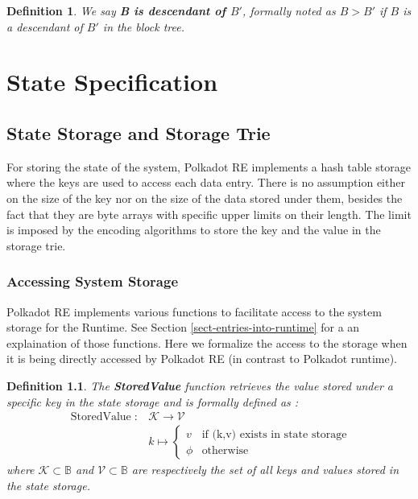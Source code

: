 \documentclass{book}
\newcommand{\tmop}[1]{\ensuremath{\operatorname{#1}}}
\newcommand{\tmstrong}[1]{\textbf{#1}}
\newcommand{\tmtextbf}[1]{{\bfseries{#1}}}
\newtheorem{definition}{Definition}
\providecommand{\tmop}[1]{\ensuremath{\mathrm{#1}}}
\providecommand{\tmstrong}[1]{\tmtextbf{#1}}
\providecommand{\tmtextbf}[1]{\tmtextbf{#1}}
\newtheorem{definition}{Definition}
\begin{document}
\begin{definition}
  We say {\tmstrong{B is descendant of $B'$}}, formally noted as {\tmstrong{$B
  > B'$}} if $B$ is a descendant of $B'$ in the block tree.
\end{definition}

\chapter{State Specification}\label{chap-state-spec}

\section{State Storage and Storage Trie}\label{sect-state-storage}

For storing the state of the system, Polkadot RE implements a hash table
storage where the keys are used to access each data entry. There is no
assumption either on the size of the key nor on the size of the data stored
under them, besides the fact that they are byte arrays with specific upper
limits on their length. The limit is imposed by the encoding algorithms to
store the key and the value in the storage trie.

\subsection{Accessing System Storage }

Polkadot RE implements various functions to facilitate access to the system
storage for the Runtime. See Section \ref{sect-entries-into-runtime} for a an
explaination of those functions. Here we formalize the access to the storage
when it is being directly accessed by Polkadot RE (in contrast to Polkadot
runtime).

\begin{definition}
  \label{defn-stored-value}The \label{autolab24}{\tmstrong{StoredValue}}
  function retrieves the value stored under a specific key in the state
  storage and is formally defined as :
  \[ \begin{array}{cc}
       \tmop{StoredValue} : & \mathcal{K} \rightarrow \mathcal{V}\\
       & k \mapsto \left\{ \begin{array}{cc}
         v & \text{if (k,v) exists in state storage}\\
         \phi & \tmop{otherwise}
       \end{array} \right.
     \end{array} \]
  where $\mathcal{K} \subset \mathbb{B}$ and $\mathcal{V} \subset \mathbb{B}$
  are respectively the set of all keys and values stored in the state storage.
  
  \ 
\end{definition}
\end{document}
